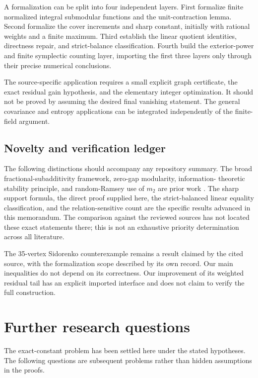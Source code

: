 \documentclass[11pt]{article}
\theoremstyle{definition}
\theoremstyle{remark}
\newcommand{\1}{\mathbf 1}
\begin{document}
A formalization can be split into four independent layers. First formalize
finite normalized integral submodular functions and the unit-contraction lemma.
Second formalize the cover increments and sharp constant, initially with
rational weights and a finite maximum. Third establish the linear quotient
identities, directness repair, and strict-balance classification. Fourth build
the exterior-power and finite symplectic counting layer, importing the first
three layers only through their precise numerical conclusions.

The source-specific application requires a small explicit graph certificate,
the exact residual gain hypothesis, and the elementary integer optimization.
It should not be proved by assuming the desired final vanishing statement.
The general covariance and entropy applications can be integrated independently
of the finite-field argument.

\subsection{Novelty and verification ledger}

The following distinctions should accompany any repository summary.
The broad fractional-subadditivity framework, zero-gap modularity, information-
theoretic stability principle, and random-Ramsey use of $m_2$ are prior work
\cite{MadimanTetali,EllisEtAl,Jakhar2025,Jakhar2026,RamseyTilings}.
The sharp support formula, the direct proof supplied here, the strict-balanced
linear equality classification, and the relation-sensitive count are the
specific results advanced in this memorandum. The comparison against the
reviewed sources has not located these exact statements there; this is not an
exhaustive priority determination across all literature.

The 35-vertex Sidorenko counterexample remains a result claimed by the cited
source, with the formalization scope described by its own record. Our main
inequalities do not depend on its correctness. Our improvement of its weighted
residual tail has an explicit imported interface and does not claim to verify
the full construction.

\section{Further research questions}
\label{sec:questions}

The exact-constant problem has been settled here under the stated hypotheses.
The following questions are subsequent problems rather than hidden assumptions
in the proofs.
\end{document}
